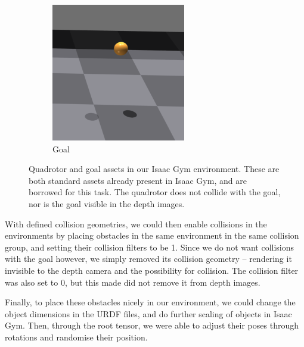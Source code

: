 \begin{figure}[H]
     \begin{subfigure}[b]{0.32\textwidth}
         \centering
         \captionsetup{justification=centering}
         \includegraphics[width=\textwidth]{figures/6_/6_goal.png}
         \caption{Goal}
         \label{fig:6_goal}
     \end{subfigure} 
     \caption{Quadrotor and goal assets in our Isaac Gym environment. These are both standard assets already present in Isaac Gym, and are borrowed for this task. The quadrotor does not collide with the goal, nor is the goal visible in the depth images.}
     \label{fig:6_quad_goal}
\end{figure}

With defined collision geometries, we could then enable collisions in the environments by placing obstacles in the same environment in the same collision group, and setting their collision filters to be 1. Since we do not want collisions with the goal however, we simply removed its collision geometry -- rendering it invisible to the depth camera and the possibility for collision. The collision filter was also set to 0, but this made did not remove it from depth images.

Finally, to place these obstacles nicely in our environment, we could change the object dimensions in the URDF files, and do further scaling of objects in Isaac Gym. Then, through the root tensor, we were able to adjust their poses through rotations and randomise their position.


